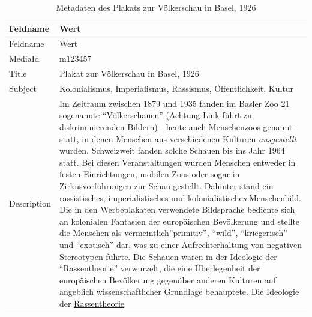 \documentclass[
  nswissgerman,
  letterpaper,
  DIV=11,
  numbers=noendperiod]{scrartcl}
\begin{document}
\begin{longtable}[]{@{}
  >{\raggedright\arraybackslash}p{}
  >{\raggedright\arraybackslash}p{}@{}}
\caption{Metadaten des Plakats zur Völkerschau in Basel,
1926}\label{tbl-metadaten-plakat-zur-voelkerschau-in-basel-1926}\tabularnewline
\toprule\noalign{}
\begin{minipage}[b]{\linewidth}\raggedright
Feldname
\end{minipage} & \begin{minipage}[b]{\linewidth}\raggedright
Wert
\end{minipage} \\
\midrule\noalign{}
\endfirsthead
\toprule\noalign{}
\begin{minipage}[b]{\linewidth}\raggedright
Feldname
\end{minipage} & \begin{minipage}[b]{\linewidth}\raggedright
Wert
\end{minipage} \\
\midrule\noalign{}
\endhead
\bottomrule\noalign{}
\endlastfoot
MediaId & m123457 \\
Title & Plakat zur Völkerschau in Basel, 1926 \\
Subject & Kolonialismus, Imperialismus, Rassismus, Öffentlichkeit,
Kultur \\
Description & Im Zeitraum zwischen 1879 und 1935 fanden im Basler Zoo 21
sogenannte
``\href{https://www.baslerstadtbuch.ch/stadtbuch/1992/1992_2247.html}{Völkerschauen''
(Achtung Link führt zu diskriminierenden Bildern)} - heute auch
Menschenzoos genannt - statt, in denen Menschen aus verschiedenen
Kulturen \emph{ausgestellt} wurden. Schweizweit fanden solche Schauen
bis ins Jahr 1964 statt. Bei diesen Veranstaltungen wurden Menschen
entweder in festen Einrichtungen, mobilen Zoos oder sogar in
Zirkusvorführungen zur Schau gestellt. Dahinter stand ein rassistisches,
imperialistisches und kolonialistische\emph{s} Menschenbild. Die in den
Werbeplakaten verwendete Bildsprache bediente sich an kolonialen
Fantasien der europäischen Bevölkerung und stellte die Menschen als
vermeintlich''primitiv''\emph{,} ``wild'', ``kriegerisch'' und
``exotisch'' dar, was zu einer Aufrechterhaltung von negativen
Stereotypen führte. Die Schauen waren in der Ideologie der
``Rassentheorie'' verwurzelt, die eine Überlegenheit der europäischen
Bevölkerung gegenüber anderen Kulturen auf angeblich wissenschaftlicher
Grundlage behauptete. Die Ideologie der
\href{https://hls-dhs-dss.ch/de/articles/060537/2024-04-08/}{Rassentheorie}

\end{longtable}
\end{document}
